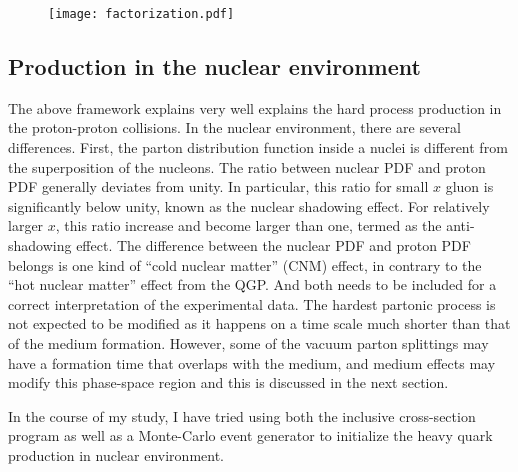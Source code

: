 \begin{figure}
\centering
\texttt{[image: factorization.pdf]}
\caption{
}
\label{fig:factorization}
\end{figure}

\subsection{Production in the nuclear environment}
The above framework explains very well explains the hard process production in the proton-proton collisions.
In the nuclear environment, there are several differences.
First, the parton distribution function inside a nuclei is different from the superposition of the nucleons.
The ratio between nuclear PDF and proton PDF generally deviates from unity.
In particular, this ratio for small $x$ gluon is significantly below unity, known as the nuclear shadowing effect. 
For relatively larger $x$, this ratio increase and become larger than one,  termed as the anti-shadowing effect.
The difference between the nuclear PDF and proton PDF belongs is one kind of ``cold nuclear matter'' (CNM) effect, in contrary to the ``hot nuclear matter'' effect from the QGP.
And both needs to be included for a correct interpretation of the experimental data.
The hardest partonic process is not expected to be modified as it happens on a time scale much shorter than that of the medium formation.
However, some of the vacuum parton splittings may have a formation time that overlaps with the medium, and medium effects may modify this phase-space region and this is discussed in the next section.

In the course of my study, I have tried using both the inclusive cross-section program as well as a Monte-Carlo event generator to initialize the heavy quark production in nuclear environment.
